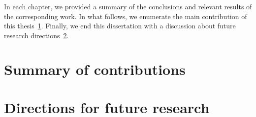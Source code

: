 In each chapter, we provided a summary of the conclusions and relevant results of the corresponding work. In what follows, we enumerate the main contribution of this thesis~\ref{sec:conclusion:summary}. Finally, we end this dissertation with a discussion about future research directions~\ref{sec:conclusion:future}.

\section{Summary of contributions}
\label{sec:conclusion:summary}


\section{Directions for future research}
\label{sec:conclusion:future}

